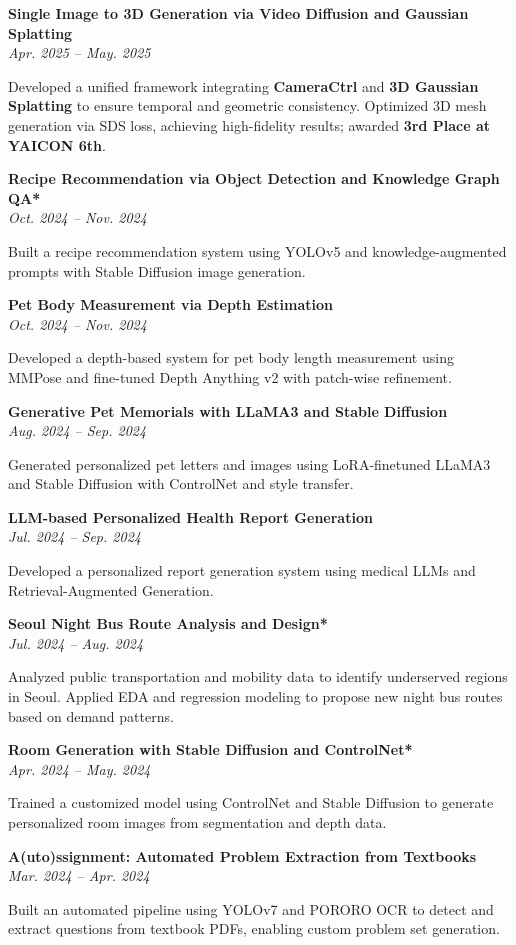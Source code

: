 \documentclass[letterpaper,11pt]{article}
\newcommand{\resumeItem}[1]{
  \item\small{
    {#1 \vspace{-2pt}}
  }
}
\newcommand{\resumeProject}[3]{\item\small{\textbf{#1}\\\textit{#2}\\#3}\vspace{2pt}}
\newcommand{\resumeItemListStart}{\begin{itemize}}
\newcommand{\resumeItemListEnd}{\end{itemize}\vspace{-5pt}}
\begin{document}
  \resumeProject
    {Single Image to 3D Generation via Video Diffusion and Gaussian Splatting}
    {Apr. 2025 -- May. 2025} 
    {\parbox[t]{0.75\textwidth}{Developed a unified framework integrating \textbf{CameraCtrl} and \textbf{3D Gaussian Splatting} to ensure temporal and geometric consistency. Optimized 3D mesh generation via SDS loss, achieving high-fidelity results; awarded \textbf{3rd Place at YAICON 6th}.}}
    
  \resumeProject
      {Recipe Recommendation via Object Detection and Knowledge Graph QA*}
      {Oct. 2024 -- Nov. 2024}
      {\parbox[t]{0.75\textwidth}{Built a recipe recommendation system using YOLOv5 and knowledge-augmented prompts with Stable Diffusion image generation.}}

  \resumeProject
      {Pet Body Measurement via Depth Estimation}
      {Oct. 2024 -- Nov. 2024}
      {\parbox[t]{0.75\textwidth}{Developed a depth-based system for pet body length measurement using MMPose and fine-tuned Depth Anything v2 with patch-wise refinement.}}   
      
  \resumeProject
      {Generative Pet Memorials with LLaMA3 and Stable Diffusion}
      {Aug. 2024 -- Sep. 2024}
      {\parbox[t]{0.75\textwidth}{Generated personalized pet letters and images using LoRA-finetuned LLaMA3 and Stable Diffusion with ControlNet and style transfer.}}

    \resumeProject
      {LLM-based Personalized Health Report Generation }
      {Jul. 2024 -- Sep. 2024}
      {\parbox[t]{0.75\textwidth}{Developed a personalized report generation system using medical LLMs and Retrieval-Augmented Generation. }}
    \resumeProject
      {Seoul Night Bus Route Analysis and Design*}
      {Jul. 2024 -- Aug. 2024}
      {\parbox[t]{0.75\textwidth}{Analyzed public transportation and mobility data to identify underserved regions in Seoul. Applied EDA and regression modeling to propose new night bus routes based on demand patterns.}}
    
    \resumeProject
      {Room Generation with Stable Diffusion and ControlNet*}
      {Apr. 2024 -- May. 2024}
      {\parbox[t]{0.73\textwidth}{Trained a customized model using ControlNet and Stable Diffusion to generate personalized room images from segmentation and depth data.}}
        
    \resumeProject
        {A(uto)ssignment: Automated Problem Extraction from Textbooks}
        {Mar. 2024 -- Apr. 2024}
        {\parbox[t]{0.75\textwidth}{
        Built an automated pipeline using YOLOv7 and PORORO OCR to detect and extract questions from textbook PDFs, enabling custom problem set generation.
        }}
        
\end{document}
